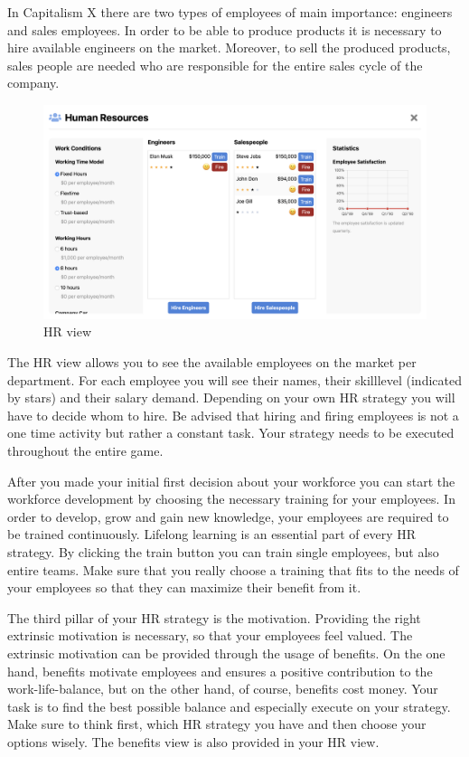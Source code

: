 In Capitalism X there are two types of employees of main importance: engineers and sales employees. In order to be able to produce products it is necessary to hire available engineers on the market. Moreover, to sell the produced products, sales people are needed who are responsible for the entire sales cycle of the company.

\begin{figure} [!htbp]
    \centering
    \includegraphics [width=\textwidth]{HR/hr_view.png}
    \caption{HR view}
    \label{fig:navigationBar}
\end{figure}

The HR view allows you to see the available employees on the market per department. For each employee you will see their names, their skilllevel (indicated by stars) and their salary demand. Depending on your own HR strategy you will have to decide whom to hire. Be advised that hiring and firing employees is not a one time activity but rather a constant task. Your strategy needs to be executed throughout the entire game.

After you made your initial first decision about your workforce you can start the workforce development by choosing the necessary training for your employees. In order to develop, grow and gain new knowledge, your employees are required to be trained continuously. Lifelong learning is an essential part of every HR strategy. By clicking the train button you can train single employees, but also entire teams. Make sure that you really choose a training that fits to the needs of your employees so that they can maximize their benefit from it.

The third pillar of your HR strategy is the motivation. Providing the right extrinsic motivation is necessary, so that your employees feel valued. The extrinsic motivation can be provided through the usage of benefits. On the one hand, benefits motivate employees and ensures a positive contribution to the work-life-balance, but on the other hand, of course, benefits cost money. Your task is to find the best possible balance and especially execute on your strategy. Make sure to think first, which HR strategy you have and then choose your options wisely. The benefits view is also provided in your HR view.